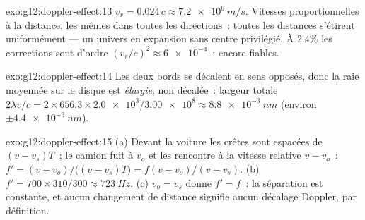 \begin{solution}{exo:g12:doppler-effect:13}
$v_r = 0.024\,c \approx \qty{7.2e6}{m/s}$. Vitesses proportionnelles à la distance, les
mêmes dans toutes les directions~: toutes les distances s'étirent uniformément --- un
univers en expansion sans centre privilégié. À $2.4\%$ les corrections sont d'ordre
$(v_r/c)^2 \approx \num{6e-4}$~: encore fiables.
\end{solution}

\begin{solution}{exo:g12:doppler-effect:14}
Les deux bords se décalent en sens opposés, donc la raie moyennée sur le disque est
\emph{élargie}, non décalée~: largeur totale $2\lambda v/c = 2 \times 656.3 \times
\num{2.0e3}/\num{3.00e8} \approx \qty{8.8e-3}{nm}$ (environ $\pm\qty{4.4e-3}{nm}$).
\end{solution}

\begin{solution}{exo:g12:doppler-effect:15}
(a) Devant la voiture les crêtes sont espacées de $(v - v_s)T$~; le camion fuit à $v_o$ et
les rencontre à la vitesse relative $v - v_o$~: $f' = (v - v_o)/\bigl((v - v_s)T\bigr) =
f(v - v_o)/(v - v_s)$. (b) $f' = 700 \times 310/300 \approx \qty{723}{Hz}$.
(c) $v_o = v_s$ donne $f' = f$~: la séparation est constante, et aucun changement de
distance signifie aucun décalage Doppler, par définition.
\end{solution}

